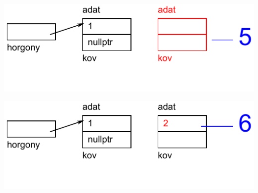 \begin{frame}
  \begin{center}
    \includegraphics[scale=0.6]{lista1/list1-05.pdf}
  \end{center}
  \vspace{-.2cm}
  \begin{exampleblock}{}
    \vspace{-.2cm}
    
    \vspace{-.2cm}
  \end{exampleblock}
\end{frame}

\begin{frame}
  \begin{center}
    \includegraphics[scale=0.6]{lista1/list1-06.pdf}
  \end{center}
  \vspace{-.2cm}
  \begin{exampleblock}{}
    \vspace{-.2cm}
    
    \vspace{-.2cm}
  \end{exampleblock}
\end{frame}

